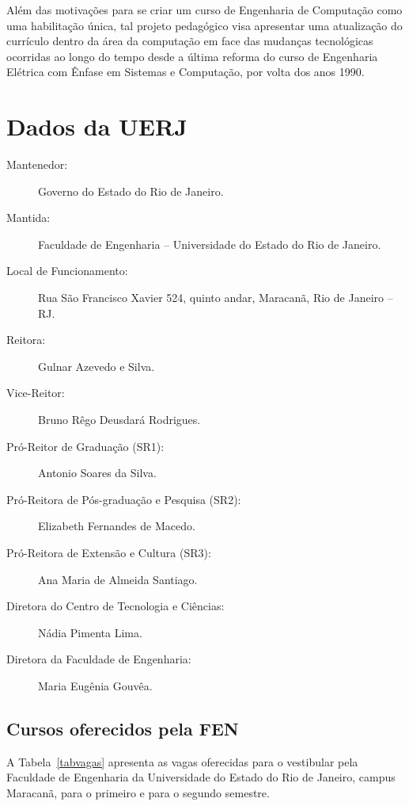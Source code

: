Além das motivações para se criar um curso de Engenharia de Computação como uma habilitação única, tal projeto pedagógico visa apresentar uma atualização do currículo dentro da área da computação em face das mudanças tecnológicas ocorridas ao longo do tempo desde a última reforma do curso de Engenharia Elétrica com Ênfase em Sistemas e Computação, por volta dos anos 1990.


\chapter{Dados da UERJ}

\begin{description}
	\item[Mantenedor:] Governo do Estado do Rio de Janeiro.
	\item [Mantida:] Faculdade de Engenharia -- Universidade do Estado do Rio de Janeiro.
	\item [Local de Funcionamento:] Rua São Francisco Xavier 524, quinto andar, Maracanã, Rio de Janeiro -- RJ.
	\item [Reitora:] Gulnar Azevedo e Silva.
	\item [Vice-Reitor:] Bruno Rêgo Deusdará Rodrigues.
	\item [Pró-Reitor de Graduação (SR1):] Antonio Soares da Silva.
	\item [Pró-Reitora de Pós-graduação e Pesquisa (SR2):] Elizabeth Fernandes de Macedo.
	\item [Pró-Reitora de Extensão e Cultura (SR3):] Ana Maria de Almeida Santiago.
	\item [Diretora do Centro de Tecnologia e Ciências:] Nádia Pimenta Lima.
	\item [Diretora da Faculdade de Engenharia:]  Maria Eugênia Gouvêa.
\end{description}


\section{Cursos oferecidos pela FEN}
A Tabela~\ref{tabvagas} apresenta as vagas oferecidas para o vestibular pela Faculdade de Engenharia da Universidade do Estado do Rio de Janeiro, campus Maracanã, para o primeiro e para o segundo semestre.
\label{sec:cursosoferecidos}

